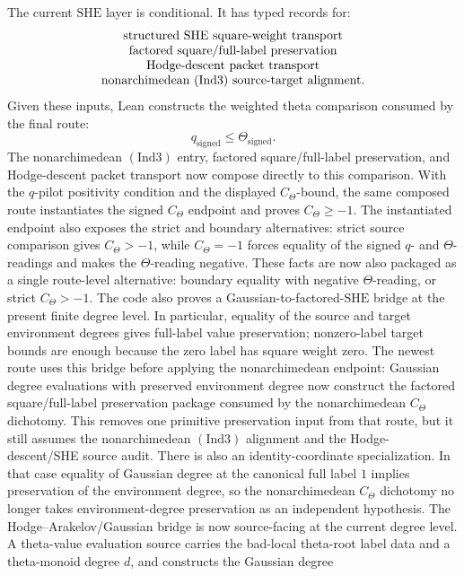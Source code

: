 \documentclass[11pt]{article}
\newcommand{\Lean}{Lean}
\newcommand{\Ind}{\ensuremath{\mathrm{Ind}}}
\newcommand{\SHE}{\ensuremath{\mathrm{SHE}}}
\theoremstyle{plain}
\theoremstyle{definition}
\theoremstyle{remark}
\begin{document}
The current \SHE{} layer is conditional.  It has typed records for:
\[
\begin{array}{c}
\text{structured \SHE{} square-weight transport}\\
\text{factored square/full-label preservation}\\
\text{Hodge-descent packet transport}\\
\text{nonarchimedean \((\Ind3)\) source-target alignment}.
\end{array}
\]
Given these inputs, \Lean{} constructs the weighted theta comparison consumed
by the final route:
\[
  q_{\mathrm{signed}}\le \Theta_{\mathrm{signed}}.
\]
The nonarchimedean \((\Ind3)\) entry, factored square/full-label preservation,
and Hodge-descent packet transport now compose directly to this comparison.
With the \(q\)-pilot positivity condition and the displayed
\(C_\Theta\)-bound, the same composed route instantiates the signed
\(C_\Theta\) endpoint and proves \(C_\Theta\ge -1\).
The instantiated endpoint also exposes the strict and boundary alternatives:
strict source comparison gives \(C_\Theta>-1\), while \(C_\Theta=-1\) forces
equality of the signed \(q\)- and \(\Theta\)-readings and makes the
\(\Theta\)-reading negative.
These facts are now also packaged as a single route-level alternative:
boundary equality with negative \(\Theta\)-reading, or strict
\(C_\Theta>-1\).
The code also proves a Gaussian-to-factored-\SHE{} bridge at the present finite
degree level.  In particular, equality of the source and target environment
degrees gives full-label value preservation; nonzero-label target bounds are
enough because the zero label has square weight zero.
The newest route uses this bridge before applying the nonarchimedean endpoint:
Gaussian degree evaluations with preserved environment degree now construct the
factored square/full-label preservation package consumed by the
nonarchimedean \(C_\Theta\) dichotomy.  This removes one primitive preservation
input from that route, but it still assumes the nonarchimedean \((\Ind3)\)
alignment and the Hodge-descent/SHE source audit.
There is also an identity-coordinate specialization.  In that case equality of
Gaussian degree at the canonical full label \(1\) implies preservation of the
environment degree, so the nonarchimedean \(C_\Theta\) dichotomy no longer
takes environment-degree preservation as an independent hypothesis.
The Hodge--Arakelov/Gaussian bridge is now source-facing at the current
degree level.  A theta-value evaluation source carries the bad-local theta-root
label data and a theta-monoid degree \(d\), and constructs the Gaussian degree
\end{document}

